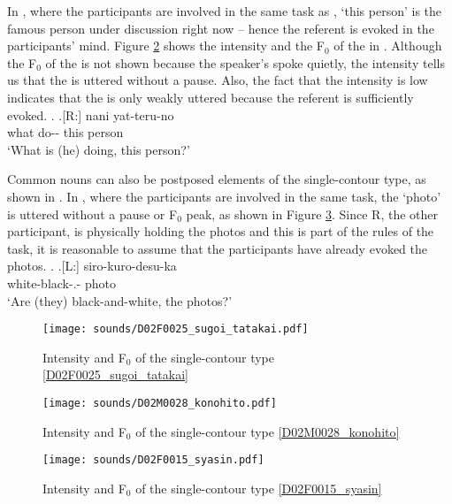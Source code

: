 In \Next,
where the participants are involved in the same task as \Last,
 `this person' is the famous person under discussion right now -- hence the referent is evoked in the participants' mind.
Figure \ref{D02M0028_konohitoF} shows the intensity and the F$_{0}$ of the  in \Next.
Although the F$_{0}$ of the  is not shown because the speaker's spoke quietly,
the intensity tells us that
the  is uttered without a pause.
Also, the fact that the intensity is low indicates that the  is only weakly uttered because the referent is sufficiently evoked.
%
\ex.\label{D02M0028_konohito}
	\ag.[R:] nani yat-teru-no   \\
			what do-- this person \\
			`What is (he) doing, this person?'

Common nouns can also be postposed elements of the single-contour type, as shown in \Next.
In \Next, where the participants are involved in the same task,
the   `photo' is uttered without a pause or F$_{0}$ peak, as shown in Figure \ref{D02F0015_syasinF}.
Since R, the other participant, is physically holding the photos and this is part of the rules of the task,
it is reasonable to assume that the participants have already evoked the photos.
%
\ex.\label{D02F0015_syasin}
	\ag.[L:] siro-kuro-desu-ka  \\
		white-black-.- photo \\
		`Are (they) black-and-white, the photos?'

\begin{figure}
	\begin{center}
	\texttt{[image: sounds/D02F0025\_sugoi\_tatakai.pdf]}
	\caption{Intensity and F$_{0}$ of the single-contour type \ref{D02F0025_sugoi_tatakai}}
	\label{D02F0025_sugoi_tatakaiF}
	\end{center}
\end{figure}
\begin{figure}
	\begin{center}
	\texttt{[image: sounds/D02M0028\_konohito.pdf]}
	\caption{Intensity and F$_{0}$ of the single-contour type \ref{D02M0028_konohito}}
	\label{D02M0028_konohitoF}
	\end{center}
\end{figure}
\begin{figure}
	\begin{center}
	\texttt{[image: sounds/D02F0015\_syasin.pdf]}
	\caption{Intensity and F$_{0}$ of the single-contour type \ref{D02F0015_syasin}}
	\label{D02F0015_syasinF}
	\end{center}
\end{figure}


